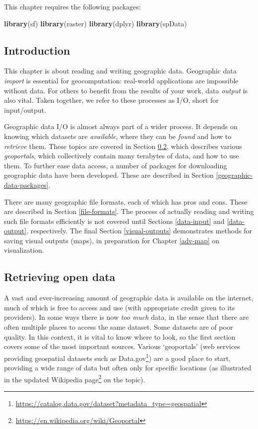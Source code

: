 \documentclass[]{krantz}
\newenvironment{Shaded}{\begin{snugshade}}{\end{snugshade}}
\newcommand{\KeywordTok}[1]{\textcolor[rgb]{0.27,0.27,0.27}{\textbf{#1}}}
\newcommand{\NormalTok}[1]{#1}
\let\rmarkdownfootnote\footnote%
\def\footnote{\protect\rmarkdownfootnote}
\renewcommand{\href}[2]{#2\footnote{\url{#1}}}
\begin{document}
This chapter requires the following packages:

\begin{Shaded}
\begin{Highlighting}[]
\KeywordTok{library}\NormalTok{(sf)}
\KeywordTok{library}\NormalTok{(raster)}
\KeywordTok{library}\NormalTok{(dplyr)}
\KeywordTok{library}\NormalTok{(spData)}
\end{Highlighting}
\end{Shaded}

\hypertarget{introduction-4}{%
\subsection{Introduction}\label{introduction-4}}

This chapter is about reading and writing geographic data.
Geographic data \emph{import} is essential for geocomputation: real-world applications are impossible without data.
For others to benefit from the results of your work, data \emph{output} is also vital.
Taken together, we refer to these processes as I/O, short for input/output.

Geographic data I/O is almost always part of a wider process.
It depends on knowing which datasets are \emph{available}, where they can be \emph{found} and how to \emph{retrieve} them.
These topics are covered in Section \ref{retrieving-data}, which describes various \emph{geoportals}, which collectively contain many terabytes of data, and how to use them.
To further ease data access, a number of packages for downloading geographic data have been developed.
These are described in Section \ref{geographic-data-packages}.

There are many geographic file formats, each of which has pros and cons.
These are described in Section \ref{file-formats}.
The process of actually reading and writing such file formats efficiently is not covered until Sections \ref{data-input} and \ref{data-output}, respectively.
The final Section \ref{visual-outputs} demonstrates methods for saving visual outputs (maps), in preparation for Chapter \ref{adv-map} on visualization.

\hypertarget{retrieving-data}{%
\subsection{Retrieving open data}\label{retrieving-data}}

A vast and ever-increasing amount of geographic data is available on the internet, much of which is free to access and use (with appropriate credit given to its providers).
In some ways there is now \emph{too much} data, in the sense that there are often multiple places to access the same dataset.
Some datasets are of poor quality.
In this context, it is vital to know where to look, so the first section covers some of the most important sources.
Various `geoportals' (web services providing geospatial datasets such as \href{https://catalog.data.gov/dataset?metadata_type=geospatial}{Data.gov}) are a good place to start, providing a wide range of data but often only for specific locations (as illustrated in the updated \href{https://en.wikipedia.org/wiki/Geoportal}{Wikipedia page} on the topic).
\end{document}
